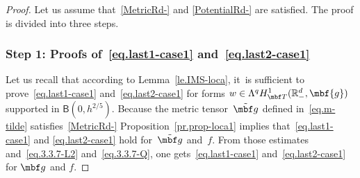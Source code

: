\begin{proof}
Let us assume that~\ref{MetricRd-} and \ref{PotentialRd-} are satisfied.
The proof is divided into three steps.

\subsubsection*{Step 1: Proofs of~\eqref{eq.last1-case1} and~\eqref{eq.last2-case1}}
Let us recall that according to Lemma~\ref{le.IMS-loca}, it~is sufficient to prove~\eqref{eq.last1-case1} and~\eqref{eq.last2-case1} for forms $w\in \Lambda^q H^1_{\mbf T}(\mathbb R^d_-, \mbf{g})$ supported in $\mathsf B(0,h^{2/5 })$.
Because the metric tensor~$\tilde{\mbf g}$ defined
in~\eqref{eq.m-tilde} satisfies~\ref{MetricRd-}
Proposition~\ref{pr.prop-loca1} implies that~\eqref{eq.last1-case1}
and \eqref{eq.last2-case1} hold
for~$\tilde{\mbf g}$ and~$f$. From those estimates
and~\eqref{eq.3.3.7-L2} and~\eqref{eq.3.3.7-Q}, one gets~\eqref{eq.last1-case1} and~\eqref{eq.last2-case1} for
${\mbf g}$ and $f$.


\end{proof}
